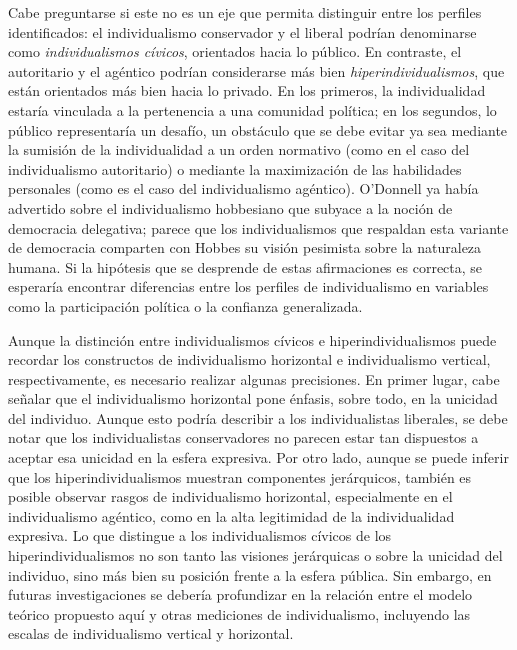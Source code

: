 \documentclass[12pt,twoside]{templates/facsothesis}
\begin{document}
Cabe preguntarse si este no es un eje que permita distinguir entre los perfiles identificados: el individualismo conservador y el liberal podrían denominarse como \emph{individualismos cívicos}, orientados hacia lo público. En contraste, el autoritario y el agéntico podrían considerarse más bien \emph{hiperindividualismos}, que están orientados más bien hacia lo privado. En los primeros, la individualidad estaría vinculada a la pertenencia a una comunidad política; en los segundos, lo público representaría un desafío, un obstáculo que se debe evitar ya sea mediante la sumisión de la individualidad a un orden normativo (como en el caso del individualismo autoritario) o mediante la maximización de las habilidades personales (como es el caso del individualismo agéntico). O'Donnell \citeyearpar{odonnell1994} ya había advertido sobre el individualismo hobbesiano que subyace a la noción de democracia delegativa; parece que los individualismos que respaldan esta variante de democracia comparten con Hobbes su visión pesimista sobre la naturaleza humana. Si la hipótesis que se desprende de estas afirmaciones es correcta, se esperaría encontrar diferencias entre los perfiles de individualismo en variables como la participación política o la confianza generalizada.

Aunque la distinción entre individualismos cívicos e hiperindividualismos puede recordar los constructos de individualismo horizontal e individualismo vertical, respectivamente, es necesario realizar algunas precisiones. En primer lugar, cabe señalar que el individualismo horizontal pone énfasis, sobre todo, en la unicidad del individuo. Aunque esto podría describir a los individualistas liberales, se debe notar que los individualistas conservadores no parecen estar tan dispuestos a aceptar esa unicidad en la esfera expresiva. Por otro lado, aunque se puede inferir que los hiperindividualismos muestran componentes jerárquicos, también es posible observar rasgos de individualismo horizontal, especialmente en el individualismo agéntico, como en la alta legitimidad de la individualidad expresiva. Lo que distingue a los individualismos cívicos de los hiperindividualismos no son tanto las visiones jerárquicas o sobre la unicidad del individuo, sino más bien su posición frente a la esfera pública. Sin embargo, en futuras investigaciones se debería profundizar en la relación entre el modelo teórico propuesto aquí y otras mediciones de individualismo, incluyendo las escalas de individualismo vertical y horizontal.
\end{document}
